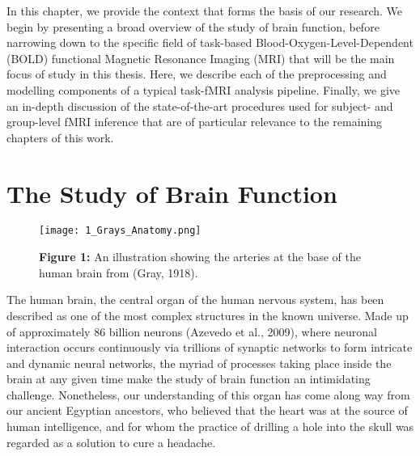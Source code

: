 In this chapter, we provide the context that forms the basis of our research. We begin by presenting a broad overview of the study of brain function, before narrowing down to the specific field of task-based Blood-Oxygen-Level-Dependent (BOLD) functional Magnetic Resonance Imaging (MRI) that will be the main focus of study in this thesis. Here, we describe each of the preprocessing and modelling components of a typical task-fMRI analysis pipeline. Finally, we give an in-depth discussion of the state-of-the-art procedures used for subject- and group-level fMRI inference that are of particular relevance to the remaining chapters of this work. 

\pagebreak

\section{The Study of Brain Function}

\begin{figure}[htbp]
\centering
	\texttt{[image: 1\_Grays\_Anatomy.png]}	
\caption*{\textbf{Figure 1:} An illustration showing the arteries at the base of the human brain from (Gray, 1918).}
\end{figure}

The human brain, the central organ of the human nervous system, has been described as one of the most complex structures in the known universe. Made up of approximately 86 billion neurons (Azevedo et al., 2009), where neuronal interaction occurs continuously via trillions of synaptic networks to form intricate and dynamic neural networks, the myriad of processes taking place inside the brain at any given time make the study of brain function an intimidating challenge. Nonetheless, our understanding of this organ has come along way from our ancient Egyptian ancestors, who believed that the heart was at the source of human intelligence, and for whom the practice of drilling a hole into the skull was regarded as a solution to cure a headache. 

